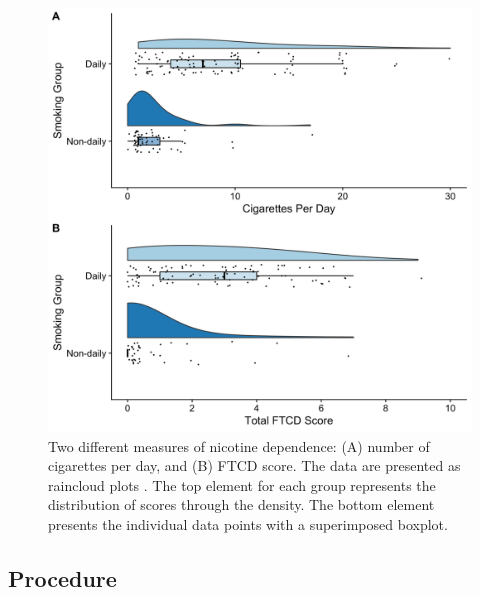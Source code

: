 \documentclass[empirical, authordate]{jote-new-article}
\begin{document}
\begin{figure}[t]

  \begin{fullwidth}
    \includegraphics[width=\linewidth]{media/image2.jpeg}
    \caption{
      Two different measures of nicotine dependence: (A) number of cigarettes per day, and (B) FTCD score. The data are presented as raincloud plots \parencite{Allen2019}. The top element for each group represents the distribution of scores through the density. The bottom element presents the individual data points with a superimposed boxplot.
    }
    \label{fig:2}

  \end{fullwidth}

\end{figure}

\subsection{Procedure}
\end{document}
